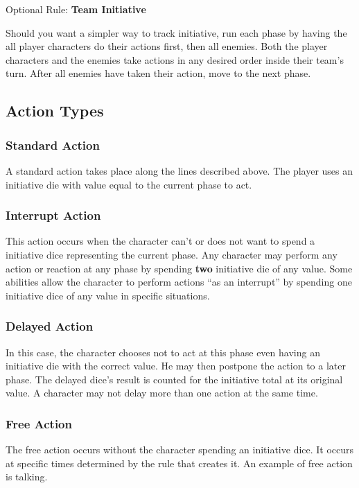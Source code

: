 \begin{multicols}{2}
\begin{boco}
    Optional Rule: \textbf{Team Initiative}\pc%
    
    Should you want a simpler way to track initiative, run each phase by having the all player characters do their actions first, then all enemies. Both the player characters and the enemies take actions in any desired order inside their team's turn. After all enemies have taken their action, move to the next phase. 
    \end{boco}
    

\subsection{Action Types}\label{subsec:actions}
\subsubsection{Standard Action}
A standard action takes place along the lines described above. The player uses an initiative die with value equal to the current phase to act.

\subsubsection{Interrupt Action}
This action occurs when the character can't or does not want to spend a initiative dice representing the current phase. Any character may perform any action or reaction at any phase by spending \textbf{two} initiative die of any value. Some abilities allow the character to perform actions “as an interrupt” by spending one initiative dice of any value in specific situations.

\subsubsection{Delayed Action}
In this case, the character chooses not to act at this phase even having an initiative die with the correct value. He may then postpone the action to a later phase. The delayed dice’s result is counted for the initiative total at its original value. A character may not delay more than one action at the same time.

\subsubsection{Free Action}
The free action occurs without the character spending an initiative dice. It occurs at specific times determined by the rule that creates it. An example of free action is talking.


\end{multicols}
